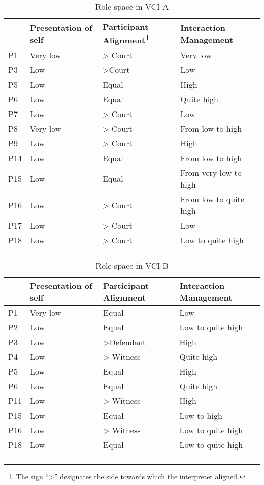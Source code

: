\documentclass[output=paper]{langsci/langscibook}
\begin{document}
\begin{table}
\begin{tabular}{llll}
\lsptoprule
   & {Presentation of self} & Participant Alignment\footnote{The sign “>” designates the side towards which the interpreter aligned.} & {Interaction Management}\\\midrule
P1 & Very low & > Court & Very low\\
P3 & Low & >Court & Low\\
P5 & Low & Equal & High\\
P6 & Low & Equal & Quite high \\
P7 & Low & > Court & Low\\
P8 & Very low & > Court & From low to high\\
P9 & Low & > Court & High\\
P14 & Low & Equal & From low to high\\
P15 & Low & Equal & From very low to high\\
P16 & Low & > Court & From low to quite high\\
P17 & Low & > Court & Low\\
P18 & Low & > Court & Low to quite high\\
\lspbottomrule
\end{tabular}
\caption{Role-space in \textsc{VCI} A\label{tab:devaux:2}}
\end{table}

\begin{table}
\begin{tabular}{llll}
\lsptoprule
& {Presentation of self} & {Participant Alignment} & {Interaction Management}\\\midrule
P1 & Very low & Equal & Low\\
P2 & Low & Equal & Low to quite high\\
P3 & Low & >Defendant & High\\
P4 & Low & > Witness & Quite high\\
P5 & Low & Equal & High\\
P6 & Low & Equal & Quite high \\
P11 & Low & > Witness & High\\
P15 & Low & Equal & Low to high \\
P16 & Low & > Witness & Low to quite high\\
P18 & Low & Equal & Low to quite high\\
\lspbottomrule
\end{tabular}
\caption{Role-space in \textsc{VCI} B\label{tab:devaux:3}}
\end{table}
\end{document}
